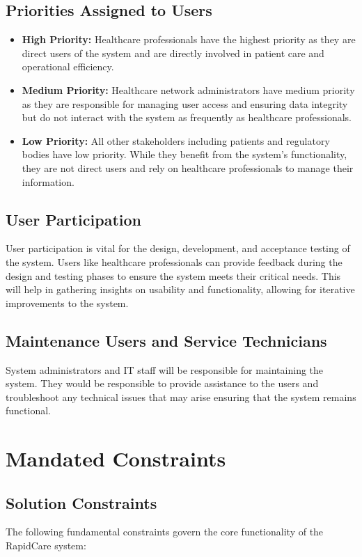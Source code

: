 \documentclass[12pt]{article}
\begin{document}
\subsection{Priorities Assigned to Users}
\begin{itemize}
    \item \textbf{High Priority:} Healthcare professionals have the highest priority as they are direct users of the system and are directly involved in patient care and operational efficiency.
    \item \textbf{Medium Priority:} Healthcare network administrators have medium priority as they are responsible for managing user access and ensuring data integrity but do not interact with the system as frequently as healthcare professionals.
    \item \textbf{Low Priority:} All other stakeholders including patients and regulatory bodies have low priority. While they benefit from the system's functionality, they are not direct users and rely on healthcare professionals to manage their information.
\end{itemize}

\subsection{User Participation}
User participation is vital for the design, development, and acceptance testing of the system. Users like healthcare professionals can provide feedback during the design and testing phases to ensure the system meets their critical needs. This will help in gathering insights on usability and functionality, allowing for iterative improvements to the system.

\subsection{Maintenance Users and Service Technicians}
System administrators and IT staff will be responsible for maintaining the system. They would be responsible to provide assistance to the users and troubleshoot any technical issues that may arise ensuring that the system remains functional. 

\section{Mandated Constraints}

\subsection{Solution Constraints}
The following fundamental constraints govern the core functionality of the RapidCare system:
\end{document}

